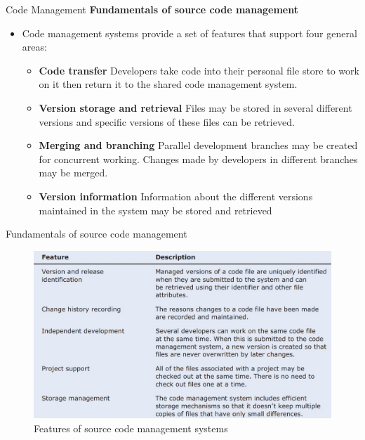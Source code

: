 \documentclass{beamer}
\begin{document}
\begin{frame}{Code Management}
	\textbf{Fundamentals of source code management}
	\begin{itemize}
		\item Code management systems provide a set of features that support four general areas:
		\begin{itemize}
			\item \textbf{Code transfer} Developers take code into their personal file store to work on it then return it to the shared code management system.
			\item \textbf{Version storage and retrieval} Files may be stored in several different versions and specific versions of these files can be retrieved.
			\item \textbf{Merging and branching} Parallel development branches may be created for concurrent working. Changes made by developers in different branches may be merged.
			\item \textbf{Version information} Information about the different versions maintained in the system may be stored and retrieved
			
		\end{itemize}
	\end{itemize}
\end{frame}
\begin{frame}{Fundamentals of source code management}
	\begin{figure}
	\includegraphics[scale=.4]{img/m3_37}
	\caption{Features of source code management systems}
\end{figure}
\end{frame}
\end{document}
